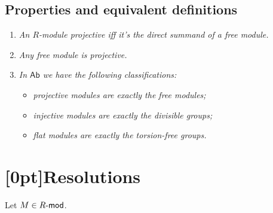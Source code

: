 \documentclass[10pt]{article}
\newcommand{\Rmod}{R\hbox{-}\mathsf{mod}}
\newcommand{\Ab}{\mathsf{Ab}}
\newcommand{\HA}{\textcolor{cyan}{HA}}
\begin{document}
        \subsection{Properties and equivalent definitions}

            \begin{enumerate}
                \item \emph{An $R$-module projective iff it's the direct summand of a free module.}
                \item \emph{Any free module is projective.}
                \item \emph{In $\Ab$ we have the following classifications:}
                    \begin{itemize}
                        \item \emph{projective modules are exactly the free modules;}
                        \item \emph{injective modules are exactly the divisible groups;}
                        \item \emph{flat modules are exactly the torsion-free groups.}
                    \end{itemize}
            \end{enumerate}

    \section{\protect\marginnote{\HA}[0pt]Resolutions}

        Let $M\in\Rmod$.
\end{document}

